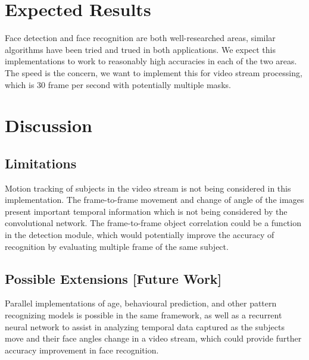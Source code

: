 \documentclass[conference]{IEEEtran}
\begin{document}
\section{Expected Results}
Face detection and face recognition are both well-researched areas, similar algorithms have been tried and trued in both applications. We expect this implementations to work to reasonably high accuracies in each of the two areas. The speed is the concern, we want to implement this for video stream processing, which is 30 frame per second with potentially multiple masks.

\section{Discussion}

\subsection{Limitations}
Motion tracking of subjects in the video stream is not being considered in this implementation. The frame-to-frame movement and change of angle of the images present important temporal information which is not being considered by the convolutional network.
The frame-to-frame object correlation could be a function in the detection module, which would potentially improve the accuracy of recognition by evaluating multiple frame of the same subject.

\subsection{Possible Extensions [Future Work]}
Parallel implementations of age, behavioural prediction, and other pattern recognizing models is possible in the same framework, as well as a recurrent neural network to assist in analyzing temporal data captured as the subjects move and their face angles change in a video stream, which could provide further accuracy improvement in face recognition.
\end{document}
